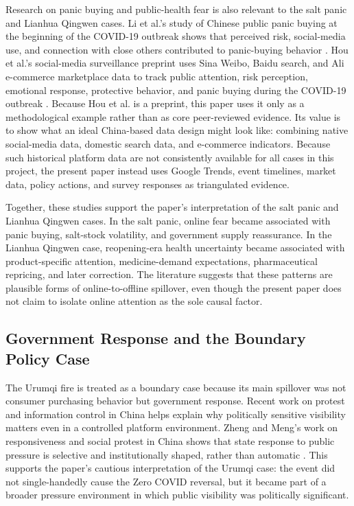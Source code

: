 \documentclass[conference]{IEEEtran}
\begin{document}
Research on panic buying and public-health fear is also relevant to the salt panic and Lianhua Qingwen cases. Li et al.'s study of Chinese public panic buying at the beginning of the COVID-19 outbreak shows that perceived risk, social-media use, and connection with close others contributed to panic-buying behavior \cite{li2022panic}. Hou et al.'s social-media surveillance preprint uses Sina Weibo, Baidu search, and Ali e-commerce marketplace data to track public attention, risk perception, emotional response, protective behavior, and panic buying during the COVID-19 outbreak \cite{hou2020public}. Because Hou et al. is a preprint, this paper uses it only as a methodological example rather than as core peer-reviewed evidence. Its value is to show what an ideal China-based data design might look like: combining native social-media data, domestic search data, and e-commerce indicators. Because such historical platform data are not consistently available for all cases in this project, the present paper instead uses Google Trends, event timelines, market data, policy actions, and survey responses as triangulated evidence.

Together, these studies support the paper's interpretation of the salt panic and Lianhua Qingwen cases. In the salt panic, online fear became associated with panic buying, salt-stock volatility, and government supply reassurance. In the Lianhua Qingwen case, reopening-era health uncertainty became associated with product-specific attention, medicine-demand expectations, pharmaceutical repricing, and later correction. The literature suggests that these patterns are plausible forms of online-to-offline spillover, even though the present paper does not claim to isolate online attention as the sole causal factor.

\subsection{Government Response and the Boundary Policy Case}

The Urumqi fire is treated as a boundary case because its main spillover was not consumer purchasing behavior but government response. Recent work on protest and information control in China helps explain why politically sensitive visibility matters even in a controlled platform environment. Zheng and Meng's work on responsiveness and social protest in China shows that state response to public pressure is selective and institutionally shaped, rather than automatic \cite{zheng2021responsiveness}. This supports the paper's cautious interpretation of the Urumqi case: the event did not single-handedly cause the Zero COVID reversal, but it became part of a broader pressure environment in which public visibility was politically significant.
\end{document}
